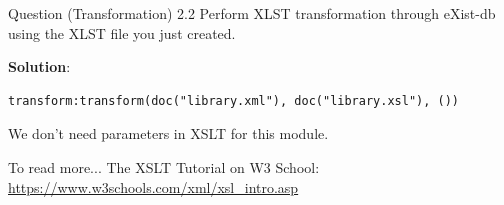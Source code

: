 \begin{frame}[fragile]{Question (Transformation) 2.2}
Perform XLST transformation through eXist-db using the XLST file you just created.\\\vspace{5pt}

\textbf{Solution}:

\begin{lstlisting}[style=xml-small-nomargin]
transform:transform(doc("library.xml"), doc("library.xsl"), ())
\end{lstlisting}\vspace{5pt}

We don't need parameters in XSLT for this module.

\begin{block}{To read more...}
	The XSLT Tutorial on W3 School: \url{https://www.w3schools.com/xml/xsl_intro.asp}
\end{block}	
\end{frame}


